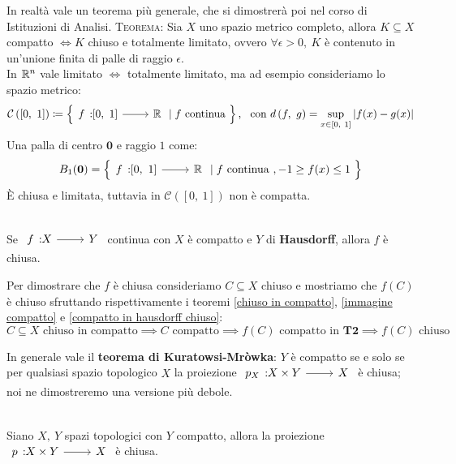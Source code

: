 \begin{digression}
In realtà vale un teorema più generale, che si dimostrerà poi nel corso di Istituzioni di Analisi.
\textsc{Teorema:} Sia $X$ uno spazio metrico completo, allora $K\subseteq X$ compatto $\iff K$ chiuso e totalmente limitato, ovvero $\forall\epsilon >0, \ K$ è contenuto in un'unione finita di palle di raggio $\epsilon$.\\
In $\mathbb{R}^n$ vale limitato $\iff$ totalmente limitato, ma ad esempio consideriamo lo spazio metrico:
	\begin{gather*}
		\mathcal{C}\left( [0, \ 1] \right) \coloneqq \left\{ \funz f {[0,\ 1]} \realset \mid f \text{ continua } \right\},  \ \ \text{con } \mvf{d}{f}{g} =\sup_{x\in [0, \ 1]} |f(x)-g(x)|
	\end{gather*}
Una palla di centro $\mathbf{0}$ e raggio $1$ come:
\begin{equation*}
	B_1(\mathbf{0})=\left\{ \funz f {[0,\ 1]} \realset \mid f \text{ continua }, -1\geq f(x) \leq 1 \ \right\}
\end{equation*}
È chiusa e limitata, tuttavia in $	\mathcal{C}\left( [0, \ 1] \right)$ non è compatta.
\end{digression}
\begin{theorema}~{}\label{da compatto in T_2 è chiuso}\\
Se $\funz f X Y$ continua con $X$ è compatto e $Y$ di \textbf{Hausdorff}, allora $f$ è chiusa.
\end{theorema}
\begin{demonstration}
	Per dimostrare che $f$ è chiusa consideriamo $C\subseteq X$ chiuso e mostriamo che $f(C)$ è chiuso sfruttando rispettivamente i teoremi \ref{chiuso in compatto}, \ref{immagine compatto} e \ref{compatto in hausdorff chiuso}:
		\begin{equation*}
			C\subseteq X \text{ chiuso in compatto} \implies C \text{ compatto} \implies f(C) \text{ compatto in } \textbf{T2} \implies f(C) \text{ chiuso}
		\end{equation*}
\end{demonstration}
In generale vale il \textbf{teorema di Kuratowsi-Mròwka}: $Y$ è compatto se e solo se per qualsiasi spazio topologico $X$ la proiezione $\funz {p_X} {X\times Y} X$ è chiusa; noi ne dimostreremo una versione più debole.
\begin{theorema}~{}\\
Siano $X,\ Y$ spazi topologici con $Y$ compatto, allora la proiezione $\funz p {X\times Y} X$ è chiusa.
\end{theorema}
